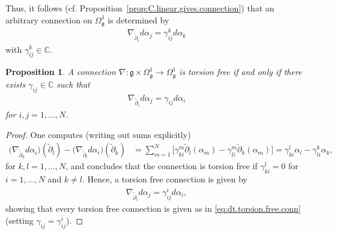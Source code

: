 \documentclass{amsart}
\newcommand{\complex}{\mathbb{C}}
\newcommand{\bracketb}[1]{\Big[#1\Big]}
\newcommand{\paraa}[1]{\big(#1\big)}
\newtheorem{proposition}[theorem]{Proposition}
\theoremstyle{definition}
\theoremstyle{remark}
\numberwithin{equation}{section}
\renewcommand{\d}{\partial}
\newcommand{\dt}{\tilde{\d}}
\newcommand{\g}{\mathfrak{g}}
\newcommand{\Omegaoneg}{\Omega^1_{\g}}
\begin{document}
\noindent
Thus, it follows
(cf. Proposition~\ref{prop:C.linear.gives.connection}) that an
arbitrary connection on $\Omegaoneg$ is determined by
\begin{align*}
  \nabla_{\dt_i}d\alpha_j = \gamma_{ij}^kd\alpha_k
\end{align*}
with $\gamma_{ij}^k\in\complex$.

\begin{proposition}\label{prop:connection.dti.torsion.free}
  A connection $\nabla:\g\times\Omegaoneg\to\Omegaoneg$ is torsion
  free if and only if there exists $\gamma_{ij}\in\complex$ such that
  \begin{align}\label{eq:dt.torsion.free.conn}
    \nabla_{\dt_i}d\alpha_j = \gamma_{ij}d\alpha_i
  \end{align}
  for $i,j=1,\ldots,N$.
\end{proposition}

\begin{proof}
  One computes (writing out sums explicitly)
  \begin{align*}
    \paraa{\nabla_{\dt_k}d\alpha_i}(\dt_l)-\paraa{\nabla_{\dt_l}d\alpha_i}(\dt_k)
    &=\sum_{m=1}^N\bracketb{\gamma_{ki}^m\dt_l(\alpha_m)-\gamma_{li}^m\dt_k(\alpha_m)}
    =\gamma_{ki}^l\alpha_l -  \gamma_{li}^k\alpha_k,
  \end{align*}
  for $k,l=1,\ldots,N$, and concludes that the connection is torsion free if
  $\gamma_{ki}^l=0$ for $i=1,\ldots,N$ and $k\neq l$. Hence, a torsion
  free connection is given by
  \begin{align*}
    \nabla_{\dt_i}d\alpha_j = \gamma_{ij}^id\alpha_i,
  \end{align*}
  showing that every torsion free connection is given as in
  \eqref{eq:dt.torsion.free.conn} (setting
  $\gamma_{ij}=\gamma_{ij}^i$).
\end{proof}
\end{document}
